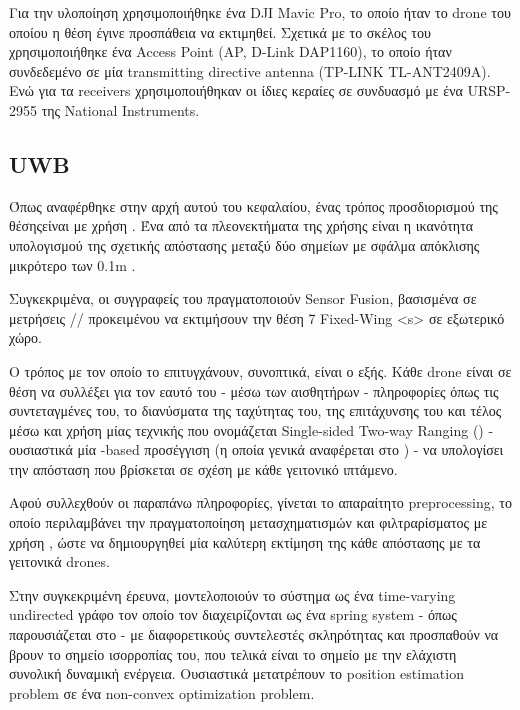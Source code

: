 Για την υλοποίηση χρησιμοποιήθηκε ένα DJI Mavic Pro, το οποίο ήταν το drone του οποίου η θέση έγινε προσπάθεια να εκτιμηθεί.
Σχετικά με το σκέλος του  χρησιμοποιήθηκε ένα Access Point (AP, D-Link DAP1160), το οποίο ήταν συ\-νδε\-δε\-μέ\-νο 
σε μία transmitting directive antenna (TP-LINK TL-ANT2409A). Ενώ για τα receivers χρησιμοποιήθηκαν οι ίδιες κεραίες σε συνδυασμό 
με ένα URSP-2955 της National Instruments.


\subsection{UWB}
Όπως αναφέρθηκε στην αρχή αυτού του κεφαλαίου, ένας τρόπος προσδιορισμού της θέσης\udot είναι με χρήση .
Ένα από τα πλεονεκτήματα της χρήσης  είναι η ικανότητα υπολογισμού της σχετικής απόστασης μεταξύ δύο
σημείων με σφάλμα απόκλισης μικρότερο των 0.1m \cite{uwb-accuracy}.

Συγκεκριμένα, οι συγγραφείς του \cite{uwb-imu-gps1} πραγματοποιούν Sensor Fusion, βασισμένα σε μετρήσεις 
// προκειμένου να εκτιμήσουν την θέση 
7 Fixed-Wing <s> σε εξωτερικό χώρο.

Ο τρόπος με τον οποίο το επιτυγχάνουν, συνοπτικά, είναι ο εξής. Κάθε drone είναι σε θέση να συλλέξει για τον εαυτό του 
- μέσω των αισθητήρων - πληροφορίες όπως τις συντεταγμένες του, το διανύσματα της ταχύτητας του, της
επιτάχυνσης του και τέλος μέσω \udot και χρήση μίας τεχνικής που ονομάζεται Single-sided Two-way Ranging 
() - ουσιαστικά μία -based προσέγγιση (η οποία γενικά αναφέρεται 
στο ) - να υπολογίσει την απόσταση που βρίσκεται σε σχέση με κάθε γειτονικό ιπτάμενο.

Αφού συλλεχθούν οι παραπάνω πληροφορίες, γίνεται το απαραίτητο preprocessing, το οποίο περιλαμβάνει την πραγματοποίηση μετασχηματισμών
και φιλτραρίσματος με χρήση , ώστε να δημιουργηθεί μία καλύτερη εκτίμηση της κάθε απόστασης με τα γειτονικά drones.

Στην συγκεκριμένη έρευνα, μοντελοποιούν το σύστημα ως ένα time-varying undirected γράφο τον οποίο τον διαχειρίζονται ως ένα spring system - 
όπως παρουσιάζεται στο  - με διαφορετικούς συντελεστές σκληρότητας και προσπαθούν να βρουν το σημείο ισορροπίας του, 
που τελικά είναι το σημείο με την ελάχιστη συνολική δυναμική ενέργεια. Ουσιαστικά μετατρέπουν το position estimation problem σε ένα 
non-convex optimization problem.


